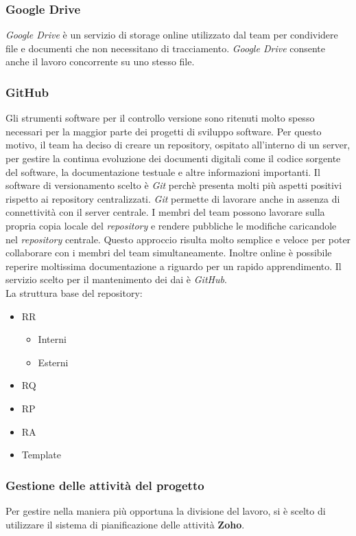 \subsubsection{Google Drive}
\textit{Google Drive} è un servizio di storage online utilizzato dal 
team per condividere file e documenti che non necessitano di tracciamento. 
\textit{Google Drive} consente anche il lavoro concorrente su uno stesso 
file.
\subsubsection{GitHub}
Gli strumenti software per il controllo versione sono ritenuti molto spesso necessari per la maggior parte dei progetti di sviluppo software.
Per questo motivo, il team ha deciso di creare un repository, ospitato all'interno di un server, per gestire la continua evoluzione dei documenti digitali come il codice sorgente del software, la documentazione testuale e altre informazioni importanti.
Il software di versionamento scelto è \textit{Git} perchè presenta molti più aspetti positivi rispetto ai repository centralizzati. \textit{Git} permette di lavorare anche in assenza di connettività con il server centrale. I membri del team possono lavorare sulla propria copia locale del \textit{repository} e rendere pubbliche le modifiche caricandole nel \textit{repository} centrale. Questo approccio risulta molto semplice e veloce per poter collaborare con i membri del team simultaneamente.
Inoltre online è possibile reperire moltissima documentazione a riguardo per un rapido apprendimento. Il servizio
scelto per il mantenimento dei dai è \textit{GitHub}. \\La struttura base del repository:
\begin{itemize}
  \item
	RR
	\begin{itemize}
		\item
			Interni
		\item
			Esterni
	\end{itemize}
  \item
    RQ
  \item
    RP
  \item
  	RA
  \item
  	Template 
\end{itemize} 

\subsubsection{Gestione delle attività del progetto}
Per gestire nella maniera più opportuna la divisione del lavoro, si è scelto di 
utilizzare il sistema di pianificazione delle attività \textbf{Zoho}.

